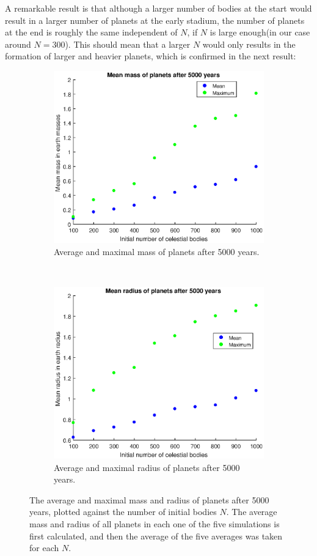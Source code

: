 A remarkable result is that although a larger number of bodies at the start would result in a larger number of planets at the early stadium, the number of planets at the end is roughly the same independent of $N$, if $N$ is large enough(in our case around $N=300$). 
This should mean that a larger $N$ would only results in the formation of larger and heavier planets, which is confirmed in the next result:
\begin{figure}[H]
	\centering
	\begin{subfigure}{0.45\textwidth}
	\includegraphics[width=\textwidth]{Eindmassa.eps}
	\caption{Average and maximal mass of planets after 5000 years.}
	\end{subfigure}
	~
	\begin{subfigure}{0.45\textwidth}
	\includegraphics[width=\textwidth]{Eindstraal.eps}
	\caption{Average and maximal radius of planets after 5000 years.}
	\end{subfigure}
	\caption{The average and maximal mass and radius of planets after 5000 years, plotted against the number of initial bodies $N$. The average mass and radius of all planets in each one of the five simulations is first calculated, and then the average of the five averages was taken for each $N$.}
	\label{AverageMassandRadius}
\end{figure} 
